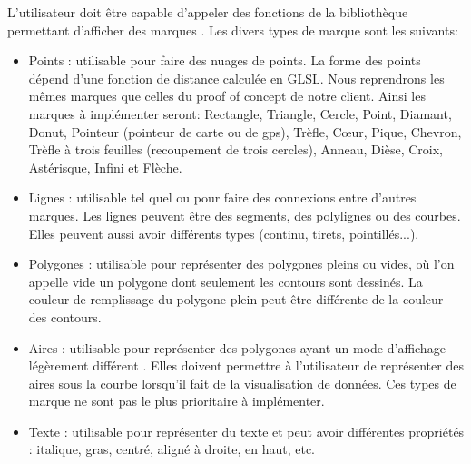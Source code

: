 \documentclass[12pt]{article}
\begin{document}
L'utilisateur doit être capable d'appeler des fonctions de la bibliothèque permettant d'afficher des
\gls{marque}s \cite{VegaMarks}. Les divers types de marque sont les suivants:
	\begin{itemize}
	\item Points : utilisable pour faire des nuages de points. La forme des points dépend d'une fonction de
    distance calculée en GLSL. Nous reprendrons les mêmes marques que celles du proof of concept de notre client.
    Ainsi les marques à implémenter seront: Rectangle, Triangle, Cercle, Point, Diamant, Donut, Pointeur (pointeur de carte ou de gps), Trèfle, Cœur, 
Pique, Chevron, Trèfle à trois feuilles (recoupement de trois cercles), Anneau, Dièse, Croix, Astérisque, Infini et Flèche.
    \item Lignes : utilisable tel quel ou pour faire des connexions entre d'autres marques. Les lignes
    peuvent être des segments, des polylignes ou des courbes. Elles peuvent aussi avoir différents types
    (continu, tirets, pointillés...).
    \item Polygones : utilisable pour représenter des polygones pleins ou vides, où l'on appelle vide un
    polygone dont seulement les contours sont dessinés. La couleur de remplissage du polygone plein peut être
    différente de la couleur des contours.
    \item Aires : utilisable pour représenter des polygones ayant un mode d'affichage légèrement différent
    \cite{VegaMarks}. Elles doivent permettre à l'utilisateur de représenter des aires sous la courbe lorsqu'il fait de la
    visualisation de données. Ces types de marque ne sont pas le plus prioritaire à implémenter.
    \item Texte : utilisable pour représenter du texte et peut avoir différentes propriétés : italique,
    gras, centré, aligné à droite, en haut, etc.
    \end{itemize}
\end{document}

